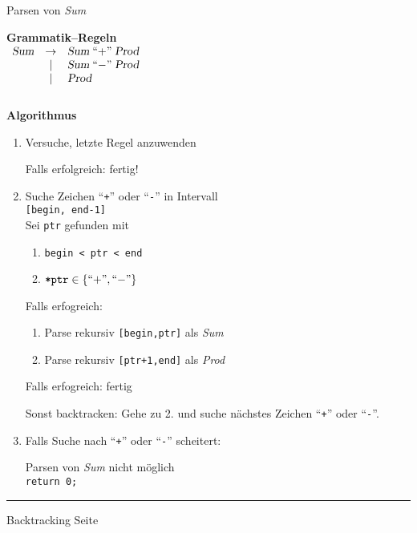 
\begin{slide}{}
\normalsize

\begin{center}
Parsen von \textsl{Sum}
\end{center}
\vspace*{0.5cm}

\footnotesize
\textbf{Grammatik--Regeln} \\[0.3cm]
\hspace*{1.3cm} 
$\begin{array}{lcl}
         \textsl{Sum}  & \rightarrow & \textsl{Sum}\; ``\mathtt{+}\cq \; \textsl{Prod}    \\
                       & |           & \textsl{Sum}\; ``\mathtt{-}\cq \; \textsl{Prod}    \\
                       & |           & \textsl{Prod}                                      \\[0.3cm]
      \end{array}
      $    

\textbf{Algorithmus}
\begin{enumerate}
\item Versuche, letzte Regel anzuwenden

      Falls erfolgreich: fertig!
\item Suche  Zeichen ``\texttt{+}'' oder ``\texttt{-}'' in Intervall  \\[0.3cm]
      \hspace*{1.3cm} \texttt{[begin, end-1]} \\[0.3cm]
      Sei \texttt{ptr} gefunden mit 
      \begin{enumerate}
      \item \texttt{begin < ptr < end}
      \item $\texttt{*ptr} \in \{ ``\mathtt{+}\cq, ``\mathtt{-}\cq \}$
      \end{enumerate}
      Falls erfogreich:
      \begin{enumerate}
      \item Parse rekursiv \texttt{[begin,ptr]} als \textsl{Sum}
      \item Parse rekursiv \texttt{[ptr+1,end]} als \textsl{Prod}
      \end{enumerate}
      Falls erfogreich: fertig

      Sonst backtracken: Gehe zu 2. und suche n\"achstes Zeichen ``\texttt{+}'' oder ``\texttt{-}''.
\item Falls Suche nach ``\texttt{+}'' oder ``\texttt{-}'' scheitert: 

      Parsen von \textsl{Sum} nicht m\"oglich \\[0.3cm]
      \hspace*{1.3cm} \texttt{return 0;}
\end{enumerate}

\vspace*{\fill}
\tiny \addtocounter{mypage}{1}
\rule{17cm}{1mm}
Backtracking  \hspace*{\fill} Seite 
\end{slide}


